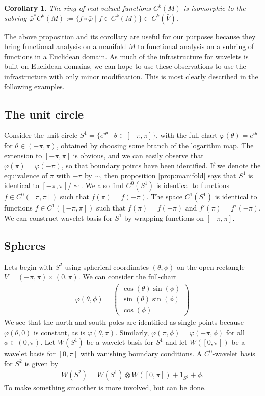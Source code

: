 \documentclass[12pt]{amsart}
\newtheorem{cor}{Corollary}
\begin{document}
\begin{cor} \label{cor:functions}
  The ring of real-valued functions $C^k(M)$ is isomorphic to the subring
  $\bar{\varphi}^* C^k(M) := \{ f \circ \bar{\varphi} \mid f \in C^k(M) \}
  \subset C^k( \bar{V})$.
\end{cor}

The above proposition and its corollary are useful for our purposes because
they bring functional analysis on a manifold $M$ to functional analysis on a subring of functions in a Euclidean domain.
As much of the infrastructure for wavelets is built on Euclidean domains, we can hope to use these observations to use the infrastructure with only
minor modification.
This is most clearly described in the following examples.

\subsection{The unit circle}
Consider the unit-circle $S^1 = \{ e^{i \theta} \mid \theta \in [-\pi,\pi] \}$,
with the full chart $\varphi( \theta ) = e^{i\theta}$ for $\theta \in (-\pi,\pi)$, obtained by choosing some branch of the logarithm map.
The extension to $[-\pi,\pi]$ is obvious, and we can easily observe that $\bar{\varphi}(\pi) = \bar{\varphi}(-\pi)$, so that boundary points have been identified.
If we denote the equivalence of $\pi$ with $-\pi$ by $\sim$, then proposition \ref{prop:manifold} says that $S^1$ is identical to $[-\pi,\pi] / \sim$.
We also find $C^0(S^1)$ is identical to functions $f \in C^0( [\pi,\pi])$ such that $f(\pi) = f(-\pi)$.
The space $C^1(S^1)$ is identical to functions $f \in C^1( [-\pi,\pi])$ such that $f(\pi) = f(-\pi)$ and $f'(\pi) = f'(-\pi)$.
 We can construct wavelet basis for $S^1$ by wrapping functions on $[-\pi,\pi]$.


\subsection{Spheres}
Lets begin with $S^2$ using spherical coordinates $(\theta , \phi)$ on the open rectangle $V = (-\pi,\pi) \times (0,\pi)$.
We can consider the full-chart
\begin{align*}
  \varphi(\theta,\phi) = \begin{pmatrix}
    \cos(\theta) \sin(\phi) \\
    \sin(\theta) \sin(\phi) \\
    \cos(\phi)
    \end{pmatrix}
\end{align*}
We see that the north and south poles are identified as single points because  $\bar{\varphi}( \theta , 0)$ is constant, as is $\bar{\varphi}(\theta, \pi)$.  Similarly, $\bar{\varphi}( \pi , \phi) = \bar{\varphi}( -\pi, \phi)$ for all $\phi \in (0,\pi)$.
Let $W(S^1)$ be a wavelet basis for $S^1$ and let $W([0,\pi])$ be a wavelet basis for $[0,\pi]$ with vanishing boundary conditions.
A $C^0$-wavelet basis for $S^2$ is given by
\begin{align*}
  W(S^2) = W(S^1) \otimes W([0,\pi]) + 1_{S^2} + \phi.
\end{align*}
To make something smoother is more involved, but can be done.
\end{document}
